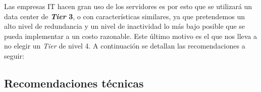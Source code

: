   Las empresas IT hacen gran uso de los servidores es por esto que se utilizará un data center de \textbf{\textit{Tier} 3}, o con características similares, ya que pretendemos un alto nivel de redundancia y un nivel de inactividad lo más bajo posible que se pueda implementar a un costo razonable.
  Este último motivo es el que nos lleva a no elegir un \textit{Tier} de nivel 4.
  A continuación se detallan las recomendaciones a seguir:
 

 
  \subsection{Recomendaciones técnicas}
  
